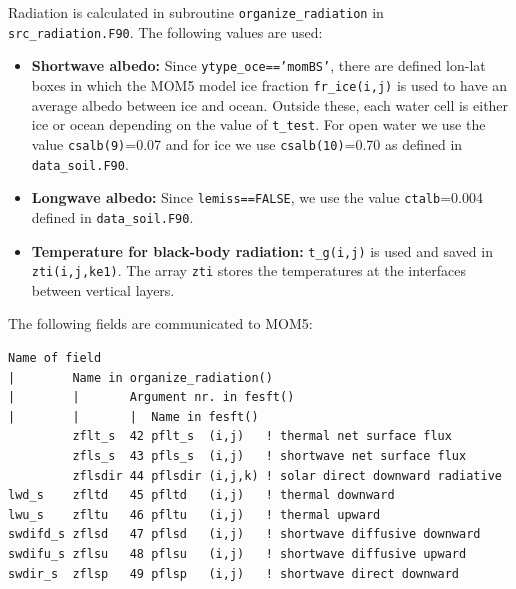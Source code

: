 \documentclass[a4paper,titlepage]{scrartcl}
\begin{document}
Radiation is calculated in subroutine \texttt{organize\_radiation} in \texttt{src\_radiation.F90}. 
The following values are used:
\begin{itemize}
\item \textbf{Shortwave albedo:} Since \texttt{ytype\_oce=='momBS'}, there are defined lon-lat boxes in which the MOM5 model ice fraction \texttt{fr\_ice(i,j)} is used to have an average albedo between ice and ocean. Outside these, each water cell is either ice or ocean depending on the value of \texttt{t\_test}. For open water we use the value \texttt{csalb(9)}=0.07 and for ice we use \texttt{csalb(10)}=0.70 as defined in \texttt{data\_soil.F90}.
\item \textbf{Longwave albedo:} Since \texttt{lemiss==FALSE}, we use the value \texttt{ctalb}=0.004 defined in \texttt{data\_soil.F90}.
\item \textbf{Temperature for black-body radiation:} \texttt{t\_g(i,j)} is used and saved in \texttt{zti(i,j,ke1)}. The array \texttt{zti} stores the temperatures at the interfaces between vertical layers.
\end{itemize}

The following fields are communicated to MOM5:
\begin{verbatim}
Name of field
|        Name in organize_radiation()
|        |       Argument nr. in fesft()
|        |       |  Name in fesft()
         zflt_s  42 pflt_s  (i,j)   ! thermal net surface flux
         zfls_s  43 pfls_s  (i,j)   ! shortwave net surface flux
         zflsdir 44 pflsdir (i,j,k) ! solar direct downward radiative
lwd_s    zfltd   45 pfltd   (i,j)   ! thermal downward
lwu_s    zfltu   46 pfltu   (i,j)   ! thermal upward
swdifd_s zflsd   47 pflsd   (i,j)   ! shortwave diffusive downward
swdifu_s zflsu   48 pflsu   (i,j)   ! shortwave diffusive upward
swdir_s  zflsp   49 pflsp   (i,j)   ! shortwave direct downward
\end{verbatim}

\newpage

\end{document}
